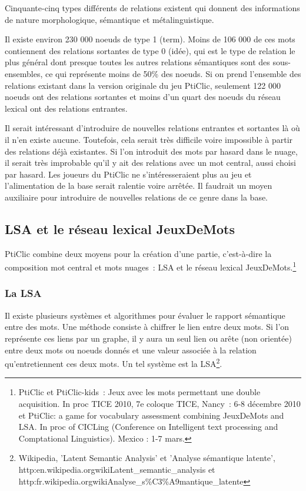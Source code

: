 \documentclass[a4paper,11pt,french]{article}
\begin{document}
Cinquante-cinq types différents de relations existent qui donnent des informations de nature morphologique, sémantique et métalinguistique. 

Il existe environ 230 000 noeuds de type 1 (term). Moins de 106 000 de ces mots contiennent des relations sortantes de type 0 (idée), qui est le type de relation le plus général dont presque toutes les autres relations sémantiques sont des sous-ensembles, ce qui représente moins de 50\% des noeuds. Si on prend l'ensemble des relations existant dans la version originale du jeu PtiClic, seulement 122 000 noeuds ont des relations sortantes et moins d'un quart des noeuds du réseau lexical ont des relations entrantes. 


Il serait intéressant d'introduire de nouvelles relations entrantes et sortantes là où il n'en existe aucune. Toutefois, cela serait très difficile voire impossible à partir des relations déjà existantes. Si l'on introduit des mots par hasard dans le nuage, il serait très improbable qu'il y ait des relations avec un mot central, aussi choisi par hasard. Les joueurs du PtiClic ne s'intéresseraient plus au jeu et l'alimentation de la base serait ralentie voire arrêtée. Il faudrait un moyen auxiliaire pour introduire de nouvelles relations de ce genre dans la base.  

\subsection{LSA et le réseau lexical JeuxDeMots}

PtiClic combine deux moyens pour la création d'une partie, c'est-à-dire la composition mot central et mots nuages~: LSA et le réseau lexical JeuxDeMots.\footnote{PtiClic et PtiClic-kids~: Jeux avec les mots permettant une double acquisition. In proc TICE 2010, 7e coloque TICE, Nancy~: 6-8 décembre 2010 et PtiClic: a game for vocabulary assessment combining JeuxDeMots and LSA. In proc of CICLing (Conference on Intelligent text processing and Comptational Linguistics). Mexico : 1-7 mars.}


\subsubsection{La LSA}

Il existe plusieurs systèmes et algorithmes pour évaluer le rapport sémantique entre des mots. Une méthode consiste à chiffrer le lien entre deux mots. Si l'on représente ces liens par un graphe, il y aura un seul lien ou arête (non orientée) entre deux mots ou noeuds donnés et une valeur associée à la relation qu'entretiennent ces deux mots. Un tel système est la LSA\footnote{Wikipedia, 'Latent Semantic Analysis' et 'Analyse sémantique latente', http:\/\/en.wikipedia.org\/wiki\/Latent\_semantic\_analysis et http:\/\/fr.wikipedia.org\/wiki\/Analyse\_s\%C3\%A9mantique\_latente}. 
\end{document}
